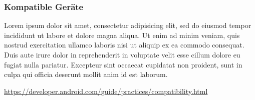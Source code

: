 \subsubsection{Kompatible Geräte}
\label{subsec:device-compability}

Lorem ipsum dolor sit amet, consectetur adipisicing elit, sed do eiusmod
tempor incididunt ut labore et dolore magna aliqua. Ut enim ad minim veniam,
quis nostrud exercitation ullamco laboris nisi ut aliquip ex ea commodo
consequat. Duis aute irure dolor in reprehenderit in voluptate velit esse
cillum dolore eu fugiat nulla pariatur. Excepteur sint occaecat cupidatat non
proident, sunt in culpa qui officia deserunt mollit anim id est laborum.

\url{https://developer.android.com/guide/practices/compatibility.html}

\clearpage %